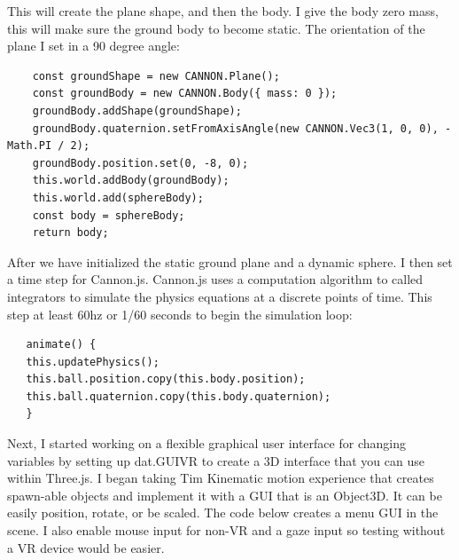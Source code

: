 \documentclass[onecolumn, draftclsnofoot,10pt, compsoc]{IEEEtran}
\begin{document}
   This will create the plane shape, and then the body. I give the body zero mass, this will make sure the ground body to become static. The orientation of the plane I set in a 90 degree angle: 
   
   \begin{lstlisting}
    const groundShape = new CANNON.Plane();
    const groundBody = new CANNON.Body({ mass: 0 });
    groundBody.addShape(groundShape);
    groundBody.quaternion.setFromAxisAngle(new CANNON.Vec3(1, 0, 0), -Math.PI / 2);
    groundBody.position.set(0, -8, 0);
    this.world.addBody(groundBody);
    this.world.add(sphereBody);
    const body = sphereBody;
    return body;
   \end{lstlisting}
    
    After we have initialized the static ground plane and a dynamic sphere. I then set a time step for Cannon.js. Cannon.js uses a computation algorithm to called integrators to simulate the physics equations at a discrete points of time. This step at least 60hz or 1/60 seconds to begin the simulation loop:
   \begin{lstlisting}
   animate() {
   this.updatePhysics();
   this.ball.position.copy(this.body.position);
   this.ball.quaternion.copy(this.body.quaternion);
   }
   \end{lstlisting} 
   
     Next, I started working on a flexible graphical user interface for changing variables by setting up dat.GUIVR to create a 3D interface that you can use within Three.js. I began taking Tim Kinematic motion experience that creates spawn-able objects and implement it with a GUI that is an Object3D. It can be easily position, rotate, or be scaled. The code below creates a menu GUI in the scene. I also enable mouse input for non-VR and a gaze input so testing without a VR device would be easier. 
     
\end{document}
